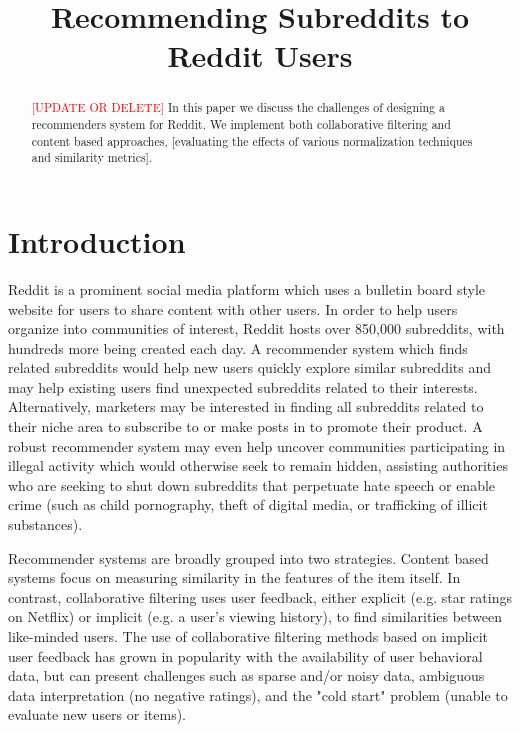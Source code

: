 \documentclass{article}
\title{Recommending Subreddits to Reddit Users}
\author{
}
\begin{document}

\maketitle

\begin{abstract}
\textcolor{red}{[UPDATE OR DELETE]} In this paper we discuss the challenges of designing a recommenders system for Reddit.  We implement both collaborative filtering and content based approaches, [evaluating the effects of various normalization techniques and similarity metrics].  
\end{abstract}

\section{Introduction}
\label{sec:intro}
Reddit is a prominent social media platform which uses a bulletin board style website for users to share content with other users. In order to help users organize into communities of interest, Reddit hosts over 850,000 subreddits, with hundreds more being created each day.  A recommender system which finds related subreddits would help new users quickly explore similar subreddits and may help existing users find unexpected subreddits related to their interests. Alternatively, marketers may be interested in finding all subreddits related to their niche area to subscribe to or make posts in to promote their product. A robust recommender system may even help uncover communities participating in illegal activity which would otherwise seek to remain hidden, assisting authorities who are seeking to shut down subreddits that perpetuate hate speech or enable crime (such as child pornography, theft of digital media, or trafficking of illicit substances).

Recommender systems are broadly grouped into two strategies.  Content based systems focus on measuring similarity in the features of the item itself.  In contrast, collaborative filtering uses user feedback, either explicit (e.g. star ratings on Netflix) or implicit (e.g. a user’s viewing history), to find similarities between like-minded users.  The use of collaborative filtering methods based on implicit user feedback has grown in popularity with the availability of user behavioral data, but can present challenges such as sparse and/or noisy data, ambiguous data interpretation (no negative ratings), and the "cold start" problem (unable to evaluate new users or items).  
\end{document}

